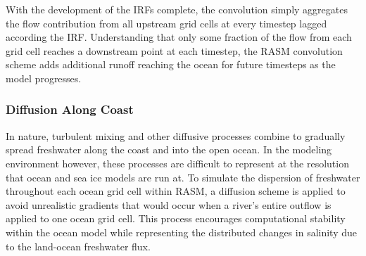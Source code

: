 With the development of the IRFs complete, the convolution simply aggregates the flow contribution from all upstream grid cells at every timestep lagged according the IRF.  Understanding that only some fraction of the flow from each grid cell reaches a downstream point at each timestep, the RASM convolution scheme adds additional runoff reaching the ocean for future timesteps as the model progresses.

\subsubsection{Diffusion Along Coast}

In nature, turbulent mixing and other diffusive processes combine to gradually spread freshwater along the coast and into the open ocean.  In the modeling environment however, these processes are difficult to represent at the resolution that ocean and sea ice models are run at.  To simulate the dispersion of freshwater throughout each ocean grid cell within RASM, a diffusion scheme is applied to avoid unrealistic gradients that would occur when a river’s entire outflow is applied to one ocean grid cell.  This process encourages computational stability within the ocean model while representing the distributed changes in salinity due to the land-ocean freshwater flux.  
  